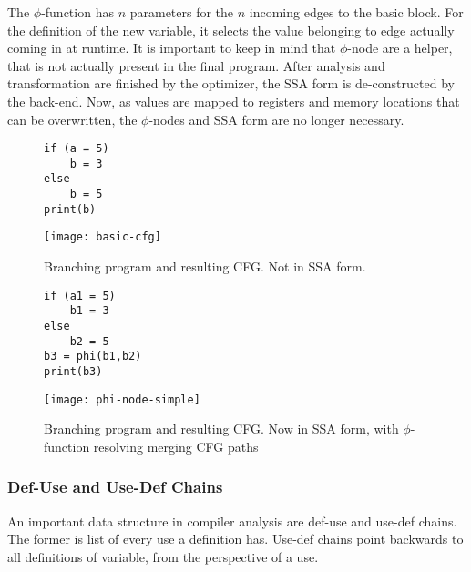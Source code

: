 The $\phi$-function has $n$ parameters for the $n$ incoming edges to the basic block. For the definition of the new variable, it selects
the value belonging to edge actually coming in at runtime. It is important to keep in mind that $\phi$-node are a helper, that is not
actually present in the final program. After analysis and transformation are finished by the optimizer, the SSA form is de-constructed
by the back-end. Now, as values are mapped to registers and memory locations that can be overwritten, the $\phi$-nodes and SSA form are no longer necessary.
\cite{Rastello:2016:SCD:3002539}

\begin{figure}[t]
	\begin{minipage}{0.4\textwidth}
		\begin{lstlisting}[style=c]
if (a = 5)
	b = 3
else
	b = 5
print(b)
		\end{lstlisting}
	\end{minipage}\hfill
	\begin{minipage} {0.45\textwidth}
			\texttt{[image: basic-cfg]}
	\end{minipage}
\caption{Branching program and resulting CFG. Not in SSA form.}
\label{simple-cfg}
\end{figure}
\begin{figure}[t]
	\begin{minipage}{0.4\textwidth}
		\begin{lstlisting}[style=c]
if (a1 = 5)
	b1 = 3
else
	b2 = 5
b3 = phi(b1,b2)
print(b3)
		\end{lstlisting}
	\end{minipage}\hfill
	\begin{minipage} {0.45\textwidth}
		\texttt{[image: phi-node-simple]}
	\end{minipage}
	\caption{Branching program and resulting CFG. Now in SSA form, with $\phi$-function resolving merging CFG paths}
	\label{simple-phi}
\end{figure}
\subsubsection{Def-Use and Use-Def Chains}
An important data structure in compiler analysis are def-use and use-def chains. The former is list of every use a definition has. Use-def chains point backwards to all definitions of variable, from the perspective of a use.  
\cite{Rastello:2016:SCD:3002539}

